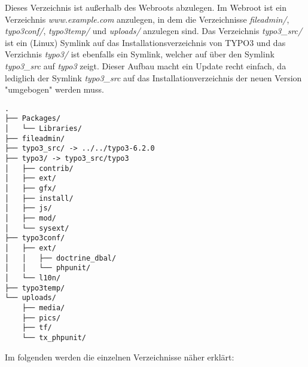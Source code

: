 Dieses Verzeichnis ist außerhalb des Webroots abzulegen. Im Webroot ist ein Verzeichnis \textit{www.example.com} anzulegen, in dem die Verzeichnisse \textit{fileadmin/}, \textit{typo3conf/}, \textit{typo3temp/} und \textit{uploads/} anzulegen sind. Das Verzeichnis \textit{typo3\_src/} ist ein (Linux) Symlink auf das Installationsverzeichnis von TYPO3 und das Verzichnis \textit{typo3/} ist ebenfalls ein Symlink, welcher auf über den Symlink \textit{typo3\_src} auf \textit{typo3} zeigt. Dieser Aufbau macht ein Update recht einfach, da lediglich der Symlink \textit{typo3\_src} auf das Installationverzeichnis der neuen Version "umgebogen" werden muss.

\begin{Verbatim}[samepage=true]
.
├── Packages/
│   └── Libraries/
├── fileadmin/
├── typo3_src/ -> ../../typo3-6.2.0
├── typo3/ -> typo3_src/typo3
│   ├── contrib/
│   ├── ext/
│   ├── gfx/
│   ├── install/
│   ├── js/
│   ├── mod/
│   └── sysext/
├── typo3conf/
│   ├── ext/
│   │   ├── doctrine_dbal/
│   │   └── phpunit/
│   └── l10n/
├── typo3temp/
└── uploads/
    ├── media/
    ├── pics/
    ├── tf/
    └── tx_phpunit/
\end{Verbatim}

Im folgenden werden die einzelnen Verzeichnisse näher erklärt:

